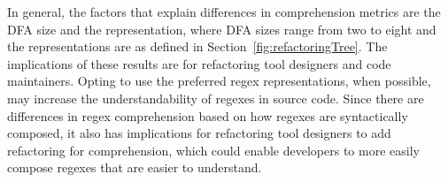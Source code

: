 In general, the factors that explain differences in comprehension metrics are the DFA size and the representation, where DFA sizes range from two to eight and the representations are as defined in Section~\ref{fig:refactoringTree}.
The implications of these results are for refactoring tool designers and code maintainers. Opting to use the preferred regex representations, when possible, may increase the understandability of regexes in source code.
Since there are differences in regex comprehension based on how regexes are syntactically composed, it also has implications for refactoring tool designers to add refactoring for comprehension, which could enable developers to more easily compose regexes that are easier to understand.
%
%
%
%
